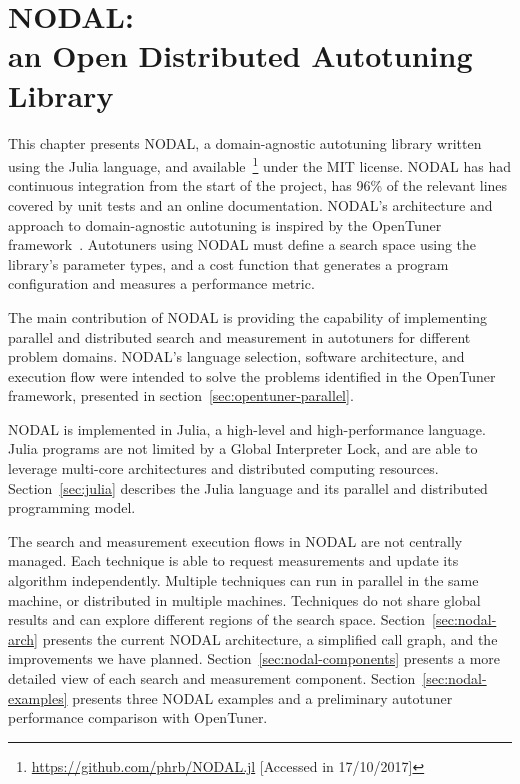 \chapter[NODAL: an Open Distributed Autotuning Library]{NODAL: \\ an Open Distributed Autotuning Library}
\label{chap:julia}

This chapter presents NODAL, a domain-agnostic autotuning library written using
the Julia language, and
available~\footnote{\url{https://github.com/phrb/NODAL.jl} [Accessed in
17/10/2017]} under the MIT license.  NODAL has had continuous integration from
the start of the project, has 96\% of the relevant lines covered by unit tests
and an online documentation. NODAL's architecture and approach to
domain-agnostic autotuning is inspired by the OpenTuner
framework~\cite{ansel2014opentuner}. Autotuners using NODAL must define a
search space using the library's parameter types, and a cost function that
generates a program configuration and measures a performance metric.

The main contribution of NODAL is providing the capability of implementing
parallel and distributed search and measurement in autotuners for different
problem domains. NODAL's language selection, software architecture, and
execution flow were intended to solve the problems identified in the OpenTuner
framework, presented in section~\ref{sec:opentuner-parallel}.

NODAL is implemented in Julia, a high-level and high-performance language.
Julia programs are not limited by a Global Interpreter Lock, and are able to
leverage multi-core architectures and distributed computing resources.
Section~\ref{sec:julia} describes the Julia language and its parallel and
distributed programming model.

The search and measurement execution flows in NODAL are not centrally managed.
Each technique is able to request measurements and update its algorithm
independently. Multiple techniques can run in parallel in the same machine, or
distributed in multiple machines.  Techniques do not share global results and
can explore different regions of the search space.
Section~\ref{sec:nodal-arch} presents the current NODAL architecture, a
simplified call graph, and the improvements we have planned.
Section~\ref{sec:nodal-components} presents a more detailed view of each search
and measurement component.  Section~\ref{sec:nodal-examples} presents three
NODAL examples and a preliminary autotuner performance comparison with
OpenTuner.

